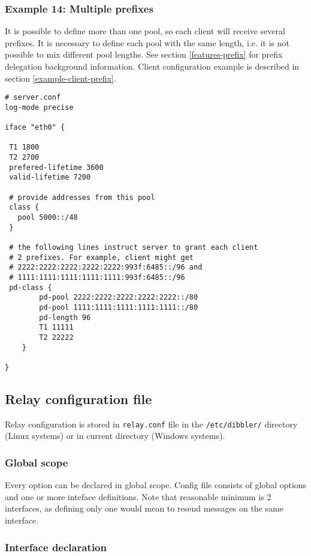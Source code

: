 \subsubsection{Example 14: Multiple prefixes}
\label{example-server-prefixes}
It is possible to define more than one pool, so each client will
receive several prefixes. It is necessary to define each pool with the
same length, i.e. it is not possible to mix different pool lengths.
See section \ref{features-prefix} for prefix delegation background
information. Client configuration example is described in section 
\ref{example-client-prefix}.

\begin{lstlisting}
# server.conf
log-mode precise

iface "eth0" {

 T1 1800
 T2 2700
 prefered-lifetime 3600
 valid-lifetime 7200

 # provide addresses from this pool 
 class {
   pool 5000::/48
 }

 # the following lines instruct server to grant each client
 # 2 prefixes. For example, client might get
 # 2222:2222:2222:2222:2222:993f:6485::/96 and 
 # 1111:1111:1111:1111:1111:993f:6485::/96
 pd-class {
        pd-pool 2222:2222:2222:2222:2222::/80
        pd-pool 1111:1111:1111:1111:1111::/80
        pd-length 96
        T1 11111
        T2 22222
    }
 
}
\end{lstlisting}

\subsection{Relay configuration file}

Relay configuration is stored in \verb+relay.conf+ file in the
\verb+/etc/dibbler/+ directory (Linux systems) or in current directory
(Windows systems).

\subsubsection{Global scope}

Every option can be declared in global scope.
Config file consists of global options and one or more inteface
definitions. Note that reasonable minimum is 2 interfaces, as defining
only one would mean to resend messages on the same interface.

\subsubsection{Interface declaration}

